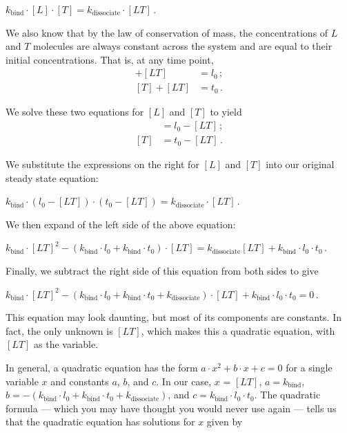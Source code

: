 \begin{center}
$k_\text{bind} \cdot [L] \cdot [T] = k_\text{dissociate} \cdot [LT] $\,.

\end{center}

We also know that by the law of conservation of mass, the concentrations of $L$ and $T$ molecules are always constant across the system and are equal to their initial concentrations. That is, at any time point,
\begin{align*}
[L] + [LT] & = l_0\,;\\
[T] + [LT] & = t_0\,.
\end{align*}

\noindent We solve these two equations for $[L]$ and $[T]$ to yield
\begin{align*}
[L] & = l_0 - [LT]\,;\\
[T] & = t_0 - [LT]\,.
\end{align*}

\noindent We substitute the expressions on the right for $[L]$ and $[T]$ into our original steady state equation:

\begin{center}
$k_\text{bind} \cdot (l_0 - [LT]) \cdot (t_0 - [LT]) = k_\text{dissociate} \cdot [LT]$\,.
\end{center}

\noindent We then expand of the left side of the above equation:

\begin{center}
$k_\text{bind} \cdot [LT]^2 - (k_\text{bind} \cdot l_0 + k_\text{bind} \cdot t_0) \cdot [LT]  = k_\text{dissociate} [LT] + k_\text{bind} \cdot l_0 \cdot t_0$\,.
\end{center}

\noindent Finally, we subtract the right side of this equation from both sides to give

\begin{center}
$k_\text{bind} \cdot [LT]^2 - (k_\text{bind} \cdot l_0 + k_\text{bind} \cdot t_0 + k_\text{dissociate}) \cdot [LT] + k_\text{bind} \cdot l_0 \cdot t_0 = 0$\,.
\end{center}

\noindent This equation may look daunting, but most of its components are constants. In fact, the only unknown is $[LT]$, which makes this a quadratic equation, with $[LT]$ as the variable.

In general, a quadratic equation has the form $a \cdot x^2 + b \cdot x + c = 0$ for a single variable $x$ and constants $a$, $b$, and $c$. In our case, $x$ = $[LT]$, $a = k_\text{bind}$, $b = - (k_\text{bind} \cdot l_0 + k_\text{bind} \cdot t_0 + k_\text{dissociate})$, and $c = k_\text{bind} \cdot l_0 \cdot t_0$. The quadratic formula --- which you may have thought you would never use again --- tells us that the quadratic equation has solutions for $x$ given by

